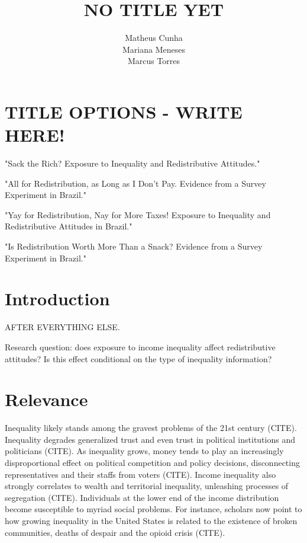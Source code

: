 \documentclass[
	article,
	12pt,
	oneside,
	a4paper,
	oneside,
	english,
	doc
	]{apa6}
\title{NO TITLE YET}
\author{Matheus Cunha \\ Mariana Meneses\\ Marcus Torres}
\affiliation{Universidade Federal de Pernambuco, Brazil}
\begin{document}
\maketitle

\section{TITLE OPTIONS - WRITE HERE!}

\begin{center}

"Sack the Rich? Exposure to Inequality and Redistributive Attitudes."

"All for Redistribution, as Long as I Don't Pay. Evidence from a Survey Experiment in Brazil." 

"Yay for Redistribution, Nay for More Taxes! Exposure to Inequality and Redistributive Attitudes in Brazil."

"Is Redistribution Worth More Than a Snack? Evidence from a Survey Experiment in Brazil."

\end{center}



\section{Introduction}

AFTER EVERYTHING ELSE. 

Research question: does exposure to income inequality affect redistributive attitudes? Is this effect conditional on the type of inequality information? 

\section{Relevance}

Inequality likely stands among the gravest problems of the 21st century (CITE).  Inequality degrades generalized trust and even trust in political institutions and politicians (CITE). As inequality grows, money tends to play an increasingly disproportional effect on political competition and policy decisions, disconnecting representatives and their staffs from voters (CITE). Income inequality also strongly correlates to wealth and territorial inequality, unleashing processes of segregation (CITE). Individuals at the lower end of the income distribution become susceptible to myriad social problems. For instance, scholars now point to how growing inequality in the United States is related to the existence of broken communities, deaths of despair and the opioid crisis (CITE).
\end{document}
